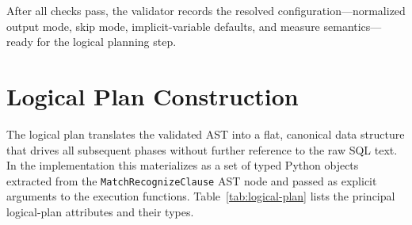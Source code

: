 \noindent
After all checks pass, the validator records the resolved
configuration—normalized output mode, skip mode, implicit-variable
defaults, and measure semantics—ready for the logical planning step.

\section{Logical Plan Construction}
\label{sec:meth-logical}

The logical plan translates the validated AST into a flat,
canonical data structure that drives all subsequent phases without
further reference to the raw SQL text.  In the implementation this
materializes as a set of typed Python objects extracted from the
\texttt{MatchRecognizeClause} AST node and passed as explicit
arguments to the execution functions.
Table~\ref{tab:logical-plan} lists the principal logical-plan
attributes and their types.

